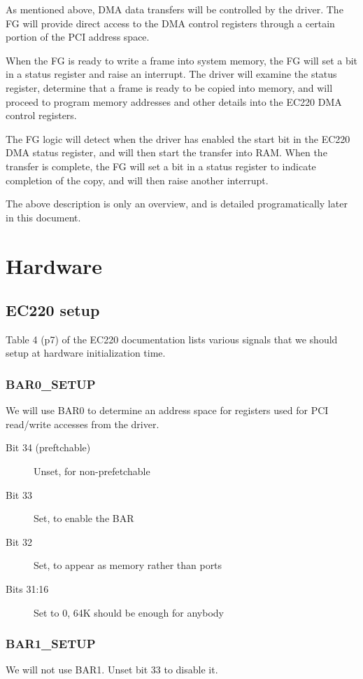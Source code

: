 \documentclass[12pt]{article}
\begin{document}
As mentioned above, DMA data transfers will be controlled by the driver. The FG will provide direct access to the DMA control registers through a certain portion of the PCI address space.

When the FG is ready to write a frame into system memory, the FG will set a bit in a status register and raise an interrupt. The driver will examine the status register, determine that a frame is ready to be copied into memory, and will proceed to program memory addresses and other details into the EC220 DMA control registers.

The FG logic will detect when the driver has enabled the start bit in the EC220 DMA status register, and will then start the transfer into RAM. When the transfer is complete, the FG will set a bit in a status register to indicate completion of the copy, and will then raise another interrupt.

The above description is only an overview, and is detailed programatically later in this document.

\section{Hardware}

\subsection{EC220 setup}

Table 4 (p7) of the EC220 documentation lists various signals that we should setup at hardware initialization time.

\subsubsection{BAR0\_SETUP}
We will use BAR0 to determine an address space for registers used for PCI read/write accesses from the driver.

\begin{description}
\item[Bit 34 (preftchable)] Unset, for non-prefetchable
\item[Bit 33] Set, to enable the BAR
\item[Bit 32] Set, to appear as memory rather than ports
\item[Bits 31:16] Set to 0, 64K should be enough for anybody
\end{description}

\subsubsection{BAR1\_SETUP}
We will not use BAR1. Unset bit 33 to disable it.
\end{document}
